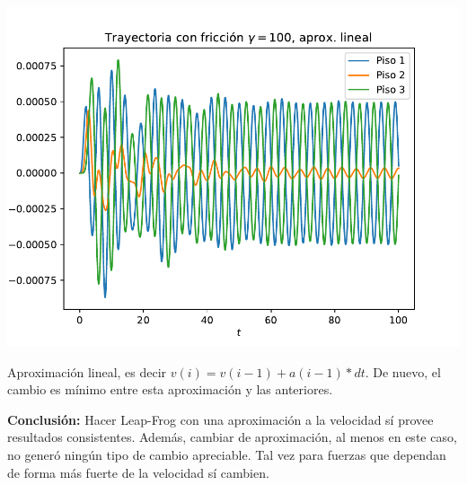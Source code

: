 \documentclass[11pt,letterpaper]{exam}
\begin{document}
\begin{center}
\includegraphics[width=14cm]{3_Edificio_bono2.pdf}
\end{center}
Aproximación lineal, es decir $v(i)=v(i-1)+a(i-1)*dt$. De nuevo, el cambio es mínimo entre esta aproximación y las anteriores.

\textbf{Conclusión:} Hacer Leap-Frog con una aproximación a la velocidad sí provee resultados consistentes. Además, cambiar de aproximación, al menos en este caso, no generó ningún tipo de cambio apreciable. Tal vez para fuerzas que dependan de forma más fuerte de la velocidad sí cambien.
\end{document}
